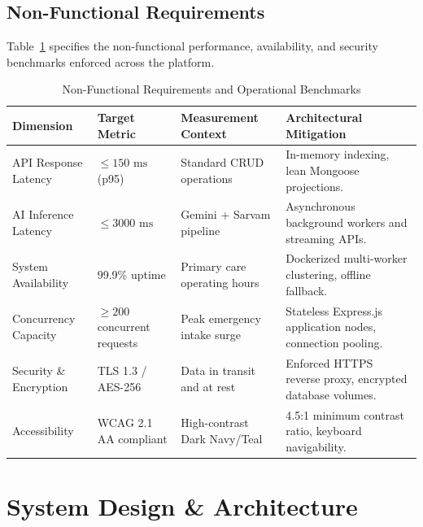 \documentclass[11pt,a4paper,oneside]{report}
\begin{document}
\section{Non-Functional Requirements}
Table~\ref{tab:nfr_matrix} specifies the non-functional performance, availability, and security benchmarks enforced across the platform.

\begin{table}[htbp]
  \centering
  \small
  \caption{Non-Functional Requirements and Operational Benchmarks}
  \label{tab:nfr_matrix}
  \begin{tabularx}{\textwidth}{lp{2.8cm}p{3.2cm}X}
    \toprule
    \textbf{Dimension} & \textbf{Target Metric} & \textbf{Measurement Context} & \textbf{Architectural Mitigation} \\
    \midrule
    API Response Latency & $\le 150\text{ ms}$ (p95) & Standard CRUD operations & In-memory indexing, lean Mongoose projections. \\
    AI Inference Latency & $\le 3000\text{ ms}$ & Gemini + Sarvam pipeline & Asynchronous background workers and streaming APIs. \\
    System Availability & 99.9\% uptime & Primary care operating hours & Dockerized multi-worker clustering, offline fallback. \\
    Concurrency Capacity & $\ge 200$ concurrent requests & Peak emergency intake surge & Stateless Express.js application nodes, connection pooling. \\
    Security \& Encryption & TLS 1.3 / AES-256 & Data in transit and at rest & Enforced HTTPS reverse proxy, encrypted database volumes. \\
    Accessibility & WCAG 2.1 AA compliant & High-contrast Dark Navy/Teal & 4.5:1 minimum contrast ratio, keyboard navigability. \\
    \bottomrule
  \end{tabularx}
\end{table}

\chapter{System Design \& Architecture}
\end{document}
